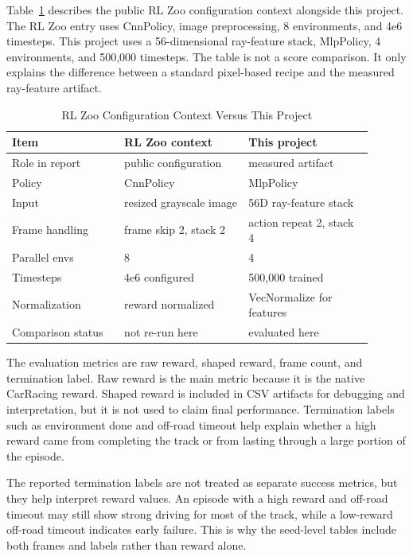 \documentclass[conference]{IEEEtran}
\begin{document}
Table~\ref{tab:context} describes the public RL Zoo configuration context alongside this project. The RL Zoo entry uses CnnPolicy, image preprocessing, 8 environments, and 4e6 timesteps. This project uses a 56-dimensional ray-feature stack, MlpPolicy, 4 environments, and 500,000 timesteps. The table is not a score comparison. It only explains the difference between a standard pixel-based recipe and the measured ray-feature artifact.

\begin{table}[t]
\caption{RL Zoo Configuration Context Versus This Project}
\label{tab:context}
\centering
\scriptsize
\begin{tabular}{p{0.28\linewidth}p{0.31\linewidth}p{0.31\linewidth}}
\toprule
Item & RL Zoo context & This project \\
\midrule
Role in report & public configuration & measured artifact \\
Policy & CnnPolicy & MlpPolicy \\
Input & resized grayscale image & 56D ray-feature stack \\
Frame handling & frame skip 2, stack 2 & action repeat 2, stack 4 \\
Parallel envs & 8 & 4 \\
Timesteps & 4e6 configured & 500,000 trained \\
Normalization & reward normalized & VecNormalize for features \\
Comparison status & not re-run here & evaluated here \\
\bottomrule
\end{tabular}
\end{table}

The evaluation metrics are raw reward, shaped reward, frame count, and termination label. Raw reward is the main metric because it is the native CarRacing reward. Shaped reward is included in CSV artifacts for debugging and interpretation, but it is not used to claim final performance. Termination labels such as environment done and off-road timeout help explain whether a high reward came from completing the track or from lasting through a large portion of the episode.

The reported termination labels are not treated as separate success metrics, but they help interpret reward values. An episode with a high reward and off-road timeout may still show strong driving for most of the track, while a low-reward off-road timeout indicates early failure. This is why the seed-level tables include both frames and labels rather than reward alone.
\end{document}
